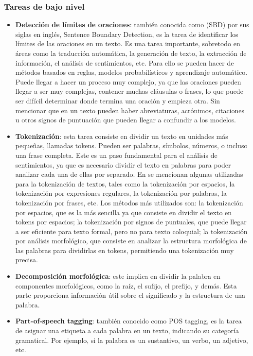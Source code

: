 \documentclass[12pt, conference]{IEEEtran}
\begin{document}
\subsubsection{Tareas de bajo nivel}
\begin{itemize}
  \item \textbf{Detección de límites de oraciones}: también conocida como (SBD) por sus siglas en inglés, Sentence Boundary Detection, es la tarea de identificar los límites de las oraciones en un texto.
  Es una tarea importante, sobretodo en áreas como la traducción automática, la generación de texto, la extracción de información, el análisis de sentimientos, etc. Para ello se pueden hacer de métodos basados en reglas, modelos probabilísticos y aprendizaje automático.
  Puede llegar a hacer un proceso muy complejo, ya que las oraciones pueden llegar a ser muy complejas, contener muchas cláusulas o frases, lo que puede ser difícil determinar donde termina una oración y empieza otra.
  Sin mencionar que en un texto pueden haber abreviaturas, acrónimos, citaciones u otros signos de puntuación que pueden llegar a confundir a los modelos.
  \item \textbf{Tokenización}: esta tarea consiste en dividir un texto en unidades más pequeñas, llamadas tokens. Pueden ser palabras, símbolos, números, o incluso una frase completa.
  Este es un paso fundamental para el análisis de sentimientos, ya que es necesario dividir el texto en palabras para poder analizar cada una de ellas por separado. En \cite{b9} se mencionan algunas utilizadas para la tokenización de textos, tales como la tokenización por espacios, la tokenización por expresiones regulares, la tokenización por palabras, la tokenización por frases, etc.
  Los métodos más utilizados son: la tokenización por espacios, que es la más sencilla ya que consiste en dividir el texto en tokens por espacios; la tokenización por signos de puntuales, que puede llegar a ser eficiente para texto formal, pero no para texto coloquial; la tokenización por análisis morfológico, que consiste en analizar la estructura morfológica de las palabras para dividirlas en tokens, permitiendo una tokenización muy precisa.
  \item \textbf{Decomposición morfológica}: este implica en dividir la palabra en componentes morfológicos, como la raíz, el sufijo, el prefijo, y demás. Esta parte proporciona información útil sobre el significado y la estructura de una palabra.
  \item \textbf{Part-of-speech tagging}: también conocido como POS tagging, es la tarea de asignar una etiqueta a cada palabra en un texto, indicando su categoría gramatical. Por ejemplo, si la palabra es un sustantivo, un verbo, un adjetivo, etc.

\end{itemize}
\end{document}
